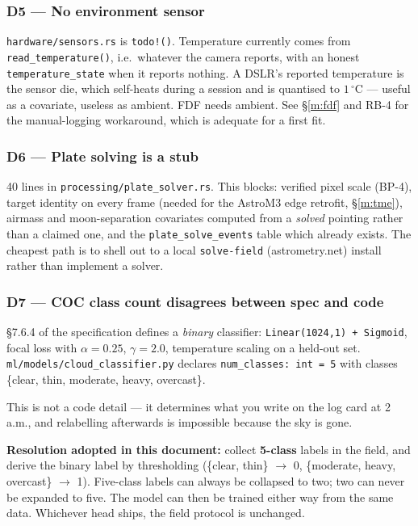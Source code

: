 \documentclass[11pt]{article}
\newcommand{\co}[1]{\texttt{\small #1}}
\begin{document}
\subsubsection*{D5 --- No environment sensor}

\co{hardware/sensors.rs} is \co{todo!()}. Temperature currently comes from
\co{read\_temperature()}, i.e.\ whatever the camera reports, with an honest
\co{temperature\_state} when it reports nothing. A DSLR's reported temperature
is the sensor die, which self-heats during a session and is quantised to
$1\,^\circ$C --- useful as a covariate, useless as ambient. FDF needs ambient.
See \S\ref{m:fdf} and RB-4 for the manual-logging workaround, which is adequate for a
first fit.

\subsubsection*{D6 --- Plate solving is a stub}

40 lines in \co{processing/plate\_solver.rs}. This blocks: verified pixel scale
(BP-4), target identity on every frame (needed for the AstroM3 edge retrofit,
\S\ref{m:tme}), airmass and moon-separation covariates computed from a \emph{solved}
pointing rather than a claimed one, and the \co{plate\_solve\_events} table
which already exists. The cheapest path is to shell out to a local
\co{solve-field} (astrometry.net) install rather than implement a solver.

\subsubsection*{D7 --- COC class count disagrees between spec and code}

\S7.6.4 of the specification defines a \emph{binary} classifier:
\co{Linear(1024,1) + Sigmoid}, focal loss with $\alpha=0.25$, $\gamma=2.0$,
temperature scaling on a held-out set. \co{ml/models/cloud\_classifier.py}
declares \co{num\_classes: int = 5} with classes
\{clear, thin, moderate, heavy, overcast\}.

This is not a code detail --- it determines what you write on the log card at
2\,a.m., and relabelling afterwards is impossible because the sky is gone.

\begin{keybox}
\textbf{Resolution adopted in this document:} collect \textbf{5-class} labels in
the field, and derive the binary label by thresholding
(\{clear, thin\} $\rightarrow$ 0, \{moderate, heavy, overcast\} $\rightarrow$ 1).
Five-class labels can always be collapsed to two; two can never be expanded to
five. The model can then be trained either way from the same data. Whichever
head ships, the field protocol is unchanged.
\end{keybox}
\end{document}
